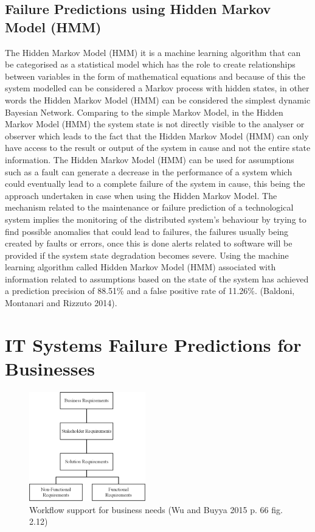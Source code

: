 \subsection{Failure Predictions using Hidden Markov Model (HMM)}

The Hidden Markov Model (HMM) it is a machine learning algorithm that can be categorised as a statistical
model which has the role to create relationships between variables in the form of mathematical equations
and because of this the system modelled can be considered a Markov process with hidden states, in other
words the Hidden Markov Model (HMM) can be considered the simplest dynamic Bayesian Network. Comparing
to the simple Markov Model, in the Hidden Markov Model (HMM) the system state is not directly visible
to the analyser or observer which leads to the fact that the Hidden Markov Model (HMM) can only have
access to the result or output of the system in cause and not the entire state information.
The Hidden Markov Model (HMM) can be used for assumptions such as a fault can generate a decrease
in the performance of a system which could eventually lead to a complete failure of the system in cause,
this being the approach undertaken in case when using the Hidden Markov Model. The mechanism related to
the maintenance or failure prediction of a technological system implies the monitoring of the distributed
system’s behaviour by trying to find possible anomalies that could lead to failures, the failures usually
being created by faults or errors, once this is done alerts related to software will be provided if the
system state degradation becomes severe. Using the machine learning algorithm called Hidden Markov Model
(HMM) associated with information related to assumptions based on the state of the system has achieved a
prediction precision of 88.51\% and a false positive rate of 11.26\%. (Baldoni, Montanari and Rizzuto 2014).

\section{IT Systems Failure Predictions for Businesses}

\begin{figure}[h]
    \centering
    \includegraphics[width=0.45\textwidth]{images/business-requirements.pdf}
    \captionsetup{justification=centering}
    \caption[Workflow support for business needs]{Workflow support for business needs
                                                  (Wu and Buyya 2015 p. 66 fig. 2.12)}
    \label{fig:network-business}
\end{figure}

